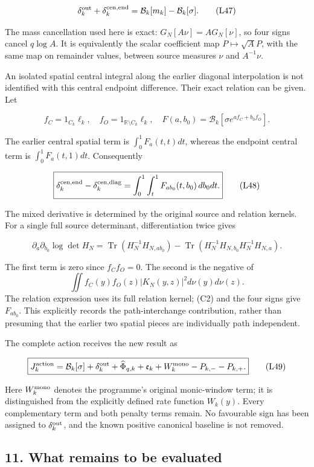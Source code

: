 \[
\delta_k^{\rm out}+\delta_k^{\rm cen,end}
=\mathcal B_k[m_k]-\mathcal B_k[\sigma].
\tag{L47}
\]

The mass cancellation used here is exact: \(G_N[A\nu]=A G_N[\nu]\), so four signs cancel \(q\log A\). It is equivalently the scalar coefficient map \(P\mapsto\sqrt A P\), with the same map on remainder values, between source measures \(\nu\) and \(A^{-1}\nu\).

An isolated spatial central integral along the earlier diagonal interpolation is not identified with this central endpoint difference. Their exact relation can be given. Let

\[
f_C=1_{C_k}\ell_k,\quad f_O=1_{\mathbb R\setminus C_k}\ell_k,
\quad F(a,b_0)=\mathcal B_k[\sigma e^{af_C+b_0f_O}].
\]

The earlier central spatial term is \(\int_0^1F_a(t,t)dt\), whereas the endpoint central term is \(\int_0^1F_a(t,1)dt\). Consequently

\[
\boxed{\delta_k^{\rm cen,end}-\delta_k^{\rm cen,diag}
=\int_0^1\int_t^1F_{ab_0}(t,b_0)\,db_0dt.}
\tag{L48}
\]

The mixed derivative is determined by the original source and relation kernels. For a single full source determinant, differentiation twice gives

\[
\partial_a\partial_{b_0}\log\det H_N
=\operatorname{Tr}(H_N^{-1}H_{N,ab_0})
-\operatorname{Tr}(H_N^{-1}H_{N,b_0}H_N^{-1}H_{N,a}).
\]

The first term is zero since \(f_Cf_O=0\). The second is the negative of
\[\iint f_C(y)f_O(z)|K_N(y,z)|^2d\nu(y)d\nu(z).\]
The relation expression uses its full relation kernel; (C2) and the four signs give \(F_{ab_0}\). This explicitly records the path-interchange contribution, rather than presuming that the earlier two spatial pieces are individually path independent.

The complete action receives the new result as

\[
\boxed{J_k^{\rm action}=\mathcal B_k[\sigma]
+\delta_k^{\rm out}+\widehat\Phi_{q,k}
+\mathfrak e_k+W_k^{\rm mono}-P_{k,-}-P_{k,+}.}
\tag{L49}
\]

Here \(W_k^{\rm mono}\) denotes the programme's original monic-window term; it is distinguished from the explicitly defined rate function \(W_k(y)\). Every complementary term and both penalty terms remain. No favourable sign has been assigned to \(\delta_k^{\rm out}\), and the known positive canonical baseline is not removed.

\subsection{11. What remains to be evaluated}\label{loc:what-remains-to-be-evaluated}

